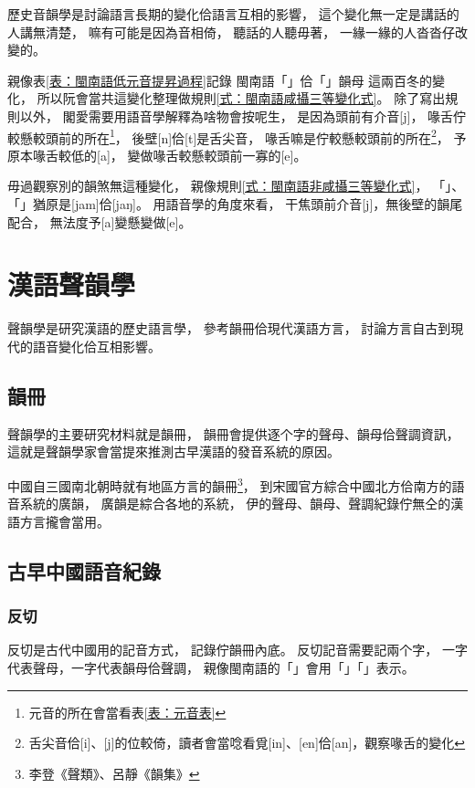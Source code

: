 歷史音韻學是討論語言長期的變化佮語言互相的影響，
這个變化無一定是講話的人講無清楚，
嘛有可能是因為音相倚，
聽話的人聽毋著，
一緣一緣的人沓沓仔改變的。

親像表\ref{表：閩南語低元音提昇過程}記錄
閩南語「」佮「」韻母
這兩百冬的變化，
所以阮會當共這變化整理做規則\ref{式：閩南語咸攝三等變化式}。
除了寫出規則以外，
閣愛需要用語音學解釋為啥物會按呢生，
是因為頭前有介音[j]，
喙舌佇較懸較頭前的所在\footnote{元音的所在會當看表\ref{表：元音表}}，
後壁[n]佮[t]是舌尖音，
喙舌嘛是佇較懸較頭前的所在\footnote{舌尖音佮[i]、[j]的位較倚，讀者會當唸看覓[in]、[en]佮[an]，觀察喙舌的變化}，
予原本喙舌較低的[a]，
變做喙舌較懸較頭前一寡的[e]。

毋過觀察別的韻煞無這種變化，
親像規則\ref{式：閩南語非咸攝三等變化式}，
「」、「」猶原是[jam]佮[jaŋ]。
用語音學的角度來看，
干焦頭前介音[j]，無後壁的韻尾配合，
無法度予[a]變懸變做[e]。


\section{漢語聲韻學}
\label{節：漢語聲韻學}
聲韻學是研究漢語的歷史語言學，
參考韻冊佮現代漢語方言，
討論方言自古到現代的語音變化佮互相影響。

\subsection{韻冊}
\label{小節：韻冊}

聲韻學的主要研究材料就是韻冊，
韻冊會提供逐个字的聲母、韻母佮聲調資訊，
這就是聲韻學家會當提來推測古早漢語的發音系統的原因。

中國自三國南北朝時就有地區方言的韻冊\footnote{李登《聲類》、呂靜《韻集》}，
到宋國官方綜合中國北方佮南方的語音系統的廣韻\cite{2002廣韻注漳州漢音}\cite{2010新校互註宋本廣韻}，
廣韻是綜合各地的系統，
伊的聲母、韻母、聲調紀錄佇無仝的漢語方言攏會當用。

\subsection{古早中國語音紀錄}
\label{小節：古早中國語音紀錄}

\subsubsection{反切}
\label{小節：反切}

反切是古代中國用的記音方式，
記錄佇韻冊內底。
反切記音需要記兩个字，
一字代表聲母，一字代表韻母佮聲調，
親像閩南語的「」會用「」「」表示。%

